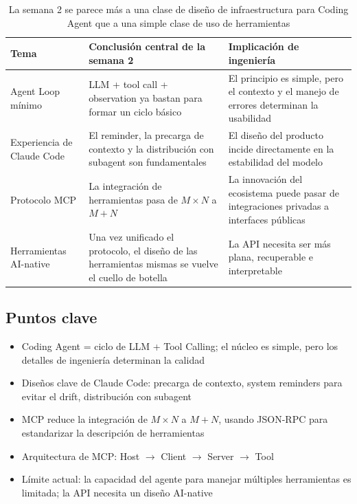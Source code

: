 \documentclass[a4paper]{article}
\begin{document}
\begin{table}[H]
\centering
\begin{tabular}{p{2.8cm}p{4.2cm}p{4.0cm}}
\toprule
\textbf{Tema} & \textbf{Conclusión central de la semana 2} & \textbf{Implicación de ingeniería} \\
\midrule
Agent Loop mínimo & LLM + tool call + observation ya bastan para formar un ciclo básico & El principio es simple, pero el contexto y el manejo de errores determinan la usabilidad \\
Experiencia de Claude Code & El reminder, la precarga de contexto y la distribución con subagent son fundamentales & El diseño del producto incide directamente en la estabilidad del modelo \\
Protocolo MCP & La integración de herramientas pasa de $M \times N$ a $M + N$ & La innovación del ecosistema puede pasar de integraciones privadas a interfaces públicas \\
Herramientas AI-native & Una vez unificado el protocolo, el diseño de las herramientas mismas se vuelve el cuello de botella & La API necesita ser más plana, recuperable e interpretable \\
\bottomrule
\end{tabular}
\caption{La semana 2 se parece más a una clase de diseño de infraestructura para Coding Agent que a una simple clase de uso de herramientas}
\end{table}

\subsection{Puntos clave}

\begin{itemize}
    \item Coding Agent = ciclo de LLM + Tool Calling; el núcleo es simple, pero los detalles de ingeniería determinan la calidad
    \item Diseños clave de Claude Code: precarga de contexto, system reminders para evitar el drift, distribución con subagent
    \item MCP reduce la integración de $M \times N$ a $M + N$, usando JSON-RPC para estandarizar la descripción de herramientas
    \item Arquitectura de MCP: Host $\rightarrow$ Client $\rightarrow$ Server $\rightarrow$ Tool
    \item Límite actual: la capacidad del agente para manejar múltiples herramientas es limitada; la API necesita un diseño AI-native
\end{itemize}
\end{document}
